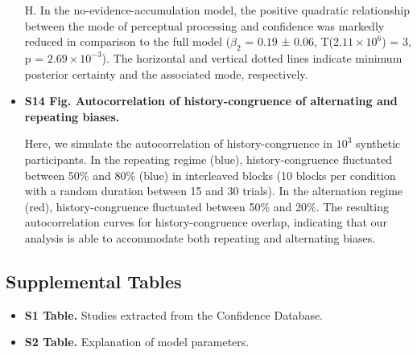 \documentclass[
]{article}
\begin{document}
\begin{itemize}
H. In the no-evidence-accumulation model, the positive quadratic
relationship between the mode of perceptual processing and confidence
was markedly reduced in comparison to the full model (\(\beta_2\) =
\(0.19\) ± \(0.06\), T(\(\ensuremath{2.11\times 10^{6}}\)) = \(3\), p =
\(\ensuremath{2.69\times 10^{-3}}\)). The horizontal and vertical dotted
lines indicate minimum posterior certainty and the associated mode,
respectively.

\item \textbf{S14 Fig. Autocorrelation of history-congruence of alternating and repeating biases.}

Here, we simulate the autocorrelation of history-congruence in \(\ensuremath{10^{3}}\)
synthetic participants. In the repeating regime (blue),
history-congruence fluctuated between 50\% and 80\% (blue) in
interleaved blocks (10 blocks per condition with a random duration
between 15 and 30 trials). In the alternation regime (red),
history-congruence fluctuated between 50\% and 20\%. The resulting
autocorrelation curves for history-congruence overlap, indicating that
our analysis is able to accommodate both repeating and alternating
biases.

\end{itemize}

\subsection*{{Supplemental Tables}\label{Supplemental Tables}}
\begin{itemize}
\item \textbf{S1 Table.} Studies extracted from the Confidence Database.
\item \textbf{S2 Table.} Explanation of model parameters.
\end{itemize}
 
\end{document}
